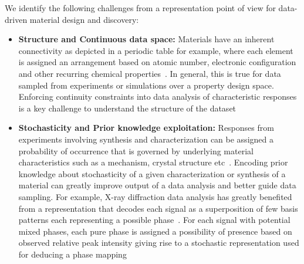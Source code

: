 We identify the following challenges from a representation point of view for data-driven material design and discovery:
\begin{itemize}
    \item {\textbf{Structure and Continuous data space: }Materials have an inherent connectivity as depicted in a periodic table for example, where each element is assigned an arrangement based on atomic number, electronic configuration and other recurring chemical properties~\cite{periodictable}. In general, this is true for data sampled from experiments or simulations over a property design space. Enforcing continuity constraints into data analysis of characteristic responses is a key challenge to understand the structure of the dataset~\cite{lebras2011constraint}}
    \item {\textbf{Stochasticity and Prior knowledge exploitation:} Responses from experiments involving synthesis and characterization can be assigned a probability of occurrence that is governed by underlying material characteristics such as a mechanism, crystal structure etc~\cite{hull2018stochasticity}. Encoding prior knowledge about stochasticity of a given characterization or synthesis of a material can greatly improve output of a data analysis and better guide data sampling.  For example, X-ray diffraction data analysis has greatly benefited from a representation that decodes each signal as a superposition of few basis patterns each representing a possible phase~\cite{Kusne2015HighthroughputDO,hattrick2016perspective}. For each signal with potential mixed phases, each pure phase is assigned a possibility of presence based on observed relative peak intensity giving rise to a stochastic representation used for deducing a phase mapping~\cite{gomes2019crystal,stanev2018unsupervised}}
\end{itemize}


